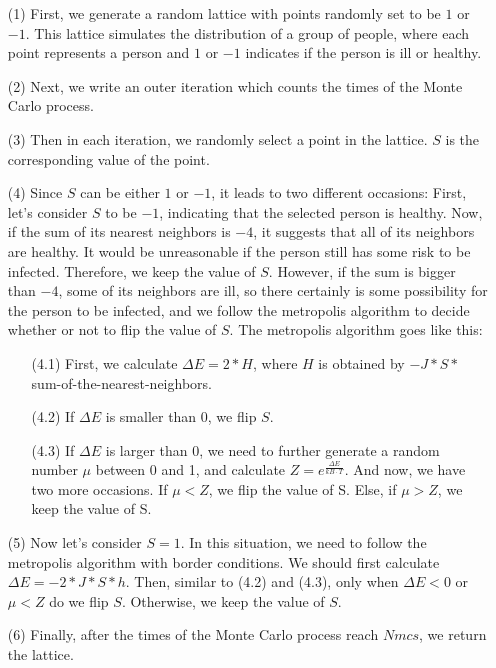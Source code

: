 \documentclass[11pt]{book}
\begin{document}
\begin{enumerate}
\item[(1)] First, we generate a random lattice with points randomly set to be $1$ or $-1$. This lattice simulates the distribution of a group of people, where each point represents a person and $1$ or $-1$ indicates if the person is ill or healthy.
\item[(2)] Next, we write an outer iteration which counts the times of the Monte Carlo process.
\item[(3)] Then in each iteration, we randomly select a point in the lattice. $S$ is the corresponding value of the point.
\item[(4)] Since $S$ can be either $1$ or $-1$, it leads to two different occasions: First, let’s consider $S$ to be $-1$, indicating that the selected person is healthy. Now, if the sum of its nearest neighbors is $-4$, it suggests that all of its neighbors are healthy. It would be unreasonable if the person still has some risk to be infected. Therefore, we keep the value of $S$. However, if the sum is bigger than $-4$, some of its neighbors are ill, so there certainly is some possibility for the person to be infected, and we follow the metropolis algorithm to decide whether or not to flip the value of $S$. The metropolis algorithm goes like this:
\begin{enumerate}
\item[(4.1)] First, we calculate $\Delta E = 2 * H$, where $H$ is obtained by $-J * S *$ sum-of-the-nearest-neighbors.
\item[(4.2)] If $\Delta E$ is smaller than 0, we flip $S$.
\item[(4.3)] If $\Delta E$ is larger than 0, we need to further generate a random number $\mu$ between 0 and 1, and calculate $Z = e^{\frac{\Delta E}{kB \cdot T}}$. And now, we have two more occasions. If $\mu < Z$, we flip the value of S. Else, if $\mu > Z$, we keep the value of S.
\end{enumerate}
\item[(5)] Now let’s consider $S = 1$. In this situation, we need to follow the metropolis algorithm with border conditions. We should first calculate $\Delta E = -2 * J * S * h$. Then, similar to (4.2) and (4.3), only when $\Delta E < 0$ or $\mu < Z$ do we flip $S$. Otherwise, we keep the value of $S$.
\item[(6)] Finally, after the times of the Monte Carlo process reach $Nmcs$, we return the lattice.
\end{enumerate}
\end{document}
